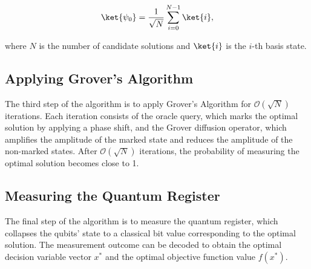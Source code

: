 \begin{equation}
\ket{\psi_0} = \frac{1}{\sqrt{N}}\sum_{i=0}^{N-1}\ket{i},
\end{equation}

where $N$ is the number of candidate solutions and $\ket{i}$ is the $i$-th basis state.

\subsection{Applying Grover's Algorithm}

The third step of the algorithm is to apply Grover's Algorithm for $\mathcal{O}(\sqrt{N})$ iterations. Each iteration consists of the oracle query, which marks the optimal solution by applying a phase shift, and the Grover diffusion operator, which amplifies the amplitude of the marked state and reduces the amplitude of the non-marked states. After $\mathcal{O}(\sqrt{N})$ iterations, the probability of measuring the optimal solution becomes close to 1.

\subsection{Measuring the Quantum Register}

The final step of the algorithm is to measure the quantum register, which collapses the qubits' state to a classical bit value corresponding to the optimal solution. The measurement outcome can be decoded to obtain the optimal decision variable vector $x^*$ and the optimal objective function value $f(x^*)$.

